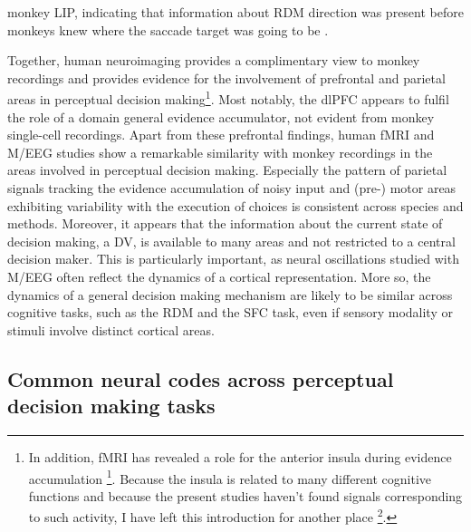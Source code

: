 monkey LIP, indicating that information about RDM direction was present before monkeys knew where the saccade target was going to be \parencite{Bennur2011}. 

Together, human neuroimaging provides a complimentary view to monkey recordings and provides evidence for the involvement of prefrontal and parietal areas in perceptual decision making\footnote{In addition, fMRI has revealed a role for the anterior insula during evidence accumulation \footcite{Ho2009,Liu2011}. Because the insula is related to many different cognitive functions and because the present studies haven’t found signals corresponding to such activity, I have left this introduction for another place \footcite{Menon2010}.}. Most notably, the dlPFC appears to fulfil the role of a domain general evidence accumulator, not evident from monkey single-cell recordings. Apart from these prefrontal findings, human fMRI and M/EEG studies show a remarkable similarity with monkey recordings in the areas involved in perceptual decision making. Especially the pattern of parietal signals tracking the evidence accumulation of noisy input and (pre-) motor areas exhibiting variability with the execution of choices is consistent across species and methods. Moreover, it appears that the information about the current state of decision making, a DV, is available to many areas and not restricted to a central decision maker. This is particularly important, as neural oscillations studied with M/EEG often reflect the dynamics of a cortical representation. More so, the dynamics of a general decision making mechanism are likely to be similar across cognitive tasks, such as the RDM and the SFC task, even if sensory modality or stimuli involve distinct cortical areas.

\subsection{Common neural codes across perceptual decision making tasks}

